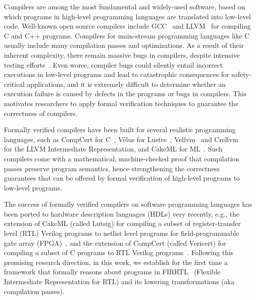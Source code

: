 
Compilers are among the most fundamental and widely-used software, based on which programs in high-level programming languages are translated into low-level code. Well-known open source compilers include GCC~\cite{GCC} and LLVM~\cite{LLVM} for compiling C and C++ programs.
Compilers for main-stream programming languages like C usually include many compilation passes and optimizations. As a result of their inherent complexity,
there remain massive bugs in compilers, despite intensive testing efforts~\cite{LeAS14,ZhangSS17}.
Even worse, compiler bugs could silently entail incorrect executions in low-level programs and lead to catastrophic consequences
for safety-critical applications, and it is extremely difficult to determine whether
an execution failure is caused by defects in the programs or
bugs in compilers. This motivates researchers to apply formal verification techniques to guarantee the correctness of compilers.

Formally verified compilers have been built for several realistic programming languages, such as CompCert for C~\cite{Leroy09,kastner2018compcert,Leroy2006,Leroy-BKSPF-2016,BlazyDL06,Kastner-LBSSF-2017},
V\'{e}lus for Lustre~\cite{BourkeBDLPR17}, Vellvm~\cite{ZhaoNMZ12,ZhaoNMZ13} and Crellvm~\cite{KangKSLPSKCCHY18} for the LLVM Intermediate Representation,
and CakeML for ML~\cite{KumarMNO14,LoowKTMNAF19,TanMKFON19,OwensNKMT17}.
Such compilers come with a mathematical, machine-checked proof
that compilation passes preserve program semantics,
hence strengthening the correctness guarantees that can be offered by formal verification of high-level programs to low-level programs.

The success of formally verified compilers on software programming languages has been ported to hardware description languages (HDLs)
very recently, e.g., the extension of CakeML (called Lutsig) for compiling %
a subset of register-transfer level (RTL) Verilog programs to netlist level programs for field-programmable gate array (FPGA)~\cite{Loow21,loowphd21},
and the extension of CompCert (called Vericert) for compiling %
a subset of C programs to RTL Verilog programs~\cite{HerklotzPRW21}.
Following this promising research direction, in this work, we establish for the first time a framework that formally reasons about programs in FIRRTL~\cite{firrtl-spec} (Flexible Intermediate Representation for RTL) and its lowering transformations (aka compilation passes).

